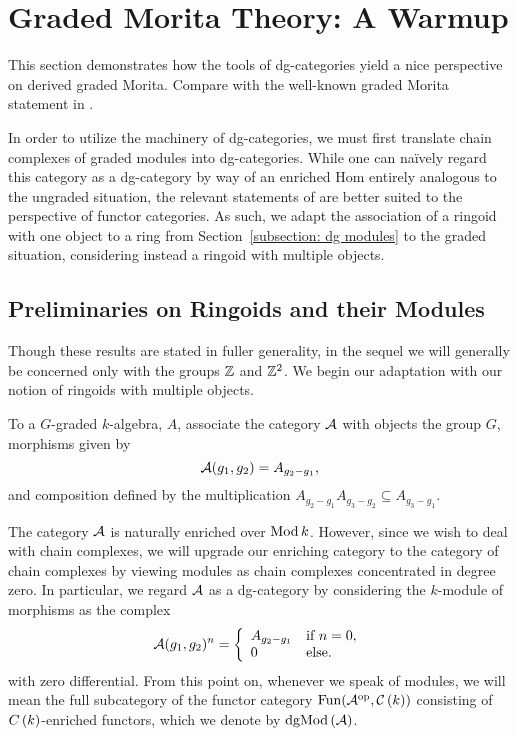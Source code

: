 \chapter{Graded Morita Theory: A Warmup} \label{chapter: graded Morita}

This section demonstrates how the tools of dg-categories yield a nice perspective on derived graded Morita. Compare with the well-known graded Morita statement in \parencite{Zhang96}. 

In order to utilize the machinery of dg-categories, we must first translate chain complexes of graded modules into dg-categories.
While one can na\"ively regard this category as a dg-category by way of an enriched Hom entirely analogous to the ungraded situation, the relevant statements of \parencite{Toen07} are better suited to the perspective of functor categories.
As such, we adapt the association of a ringoid with one object to a ring from Section~\ref{subsection: dg modules} to the graded situation, considering instead a ringoid with multiple objects.

\section{Preliminaries on Ringoids and their Modules}

Though these results are stated in fuller generality, in the sequel we will generally be concerned only with the groups \(\mathbb{Z}\) and \(\mathbb{Z}^2\).
We begin our adaptation with our notion of ringoids with multiple objects.

\begin{definition}
  To a \(G\)-graded \(k\)-algebra, \(A\), associate the category \(\mathcal{A}\) with objects the group \(G\), morphisms given by
  \[\mathcal{A}(g_1, g_2) = A_{g_2 - g_1},\]
  and composition defined by the multiplication \(A_{g_2 - g_1}A_{g_3 - g_2} \subseteq A_{g_3 - g_1}\).
\end{definition}

The category $\mathcal{A}$ is naturally enriched over $\operatorname{Mod}k$.
However, since we wish to deal with chain complexes, we will upgrade our enriching category to the category of chain complexes by viewing modules as chain complexes concentrated in degree zero.
In particular, we regard \(\mathcal{A}\) as a dg-category by considering the \(k\)-module of morphisms as the complex
$$\mathcal{A}(g_1,g_2)^n = \left\{
\begin{array}{ll}
  A_{g_2 - g_1} & \text{if}\ n = 0,\\
  0 & \text{else}.
\end{array}
\right.$$
with zero differential.
From this point on, whenever we speak of modules, we will mean the full subcategory of the functor category $\operatorname{Fun}(\mathcal{A}^{\operatorname{op}},\mathcal{C}\left(k\right))$ consisting of $C\left(k\right)$-enriched functors, which we denote by $\operatorname{dgMod}\left(\mathcal{A}\right)$.

